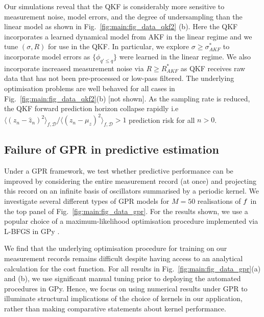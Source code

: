 Our simulations reveal that the QKF is considerably more sensitive to measurement noise, model errors, and the degree of undersampling than the linear model as shown in Fig.~\ref{fig:main:fig_data_qkf2} (b). Here the QKF incorporates a learned dynamical model from AKF in the linear regime and we tune $(\sigma, R)$ for use in the QKF.  In particular, we explore $\sigma \geq \sigma_{AKF}^*$ to incorporate model errors as $\{\phi_{q' \leq q}\}$ were learned in the linear regime.  We also incorporate increased measurement noise via $R \geq R_{AKF}^*$ as QKF receives raw data that has not been pre-processed or low-pass filtered. The underlying optimisation problems are well behaved for all cases in Fig.~\ref{fig:main:fig_data_qkf2}(b) [not shown].  As the sampling rate is reduced, the QKF forward prediction horizon collapse rapidly i.e $\langle (z_n - \hat{z}_n)^2 \rangle_{f, \mathcal{D}} / \langle (z_n - \mu_z)^2 \rangle_{f, \mathcal{D}} > 1 $ prediction risk for all $n>0$.  




\subsection{Failure of GPR in predictive estimation} 
Under a GPR framework, we test whether predictive performance can be improved by considering the entire measurement record (at once) and projecting this record on an infinite basis of oscillators summarised by a periodic kernel. We investigate several different types of GPR models for $M=50$ realisations of $f$ in the top panel of Fig.~\ref{fig:main:fig_data_gpr}. For the results shown, we use a popular choice of a maximum-likelihood optimisation procedure implemented via L-BFGS in GPy \cite{gpy2014}.

We find that the underlying optimisation procedure for training on our measurement records remains difficult despite having access to an analytical calculation for the cost function. For all results in Fig.~\ref{fig:main:fig_data_gpr}(a) and (b), we use significant manual tuning prior to deploying the automated procedures in GPy. Hence, we focus on using numerical results under GPR to illuminate structural implications of the choice of kernels in our application, rather than making comparative statements about kernel performance.

